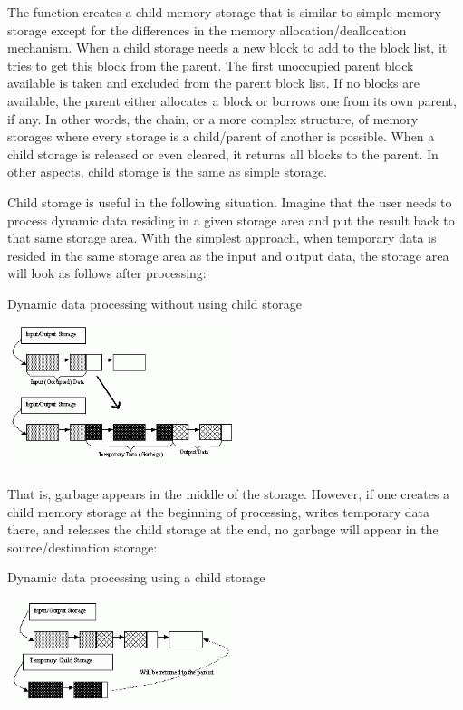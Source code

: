 
\begin{description}
\end{description}

The function creates a child memory
storage that is similar to simple memory storage except for the
differences in the memory allocation/deallocation mechanism. When a
child storage needs a new block to add to the block list, it tries
to get this block from the parent. The first unoccupied parent block
available is taken and excluded from the parent block list. If no blocks
are available, the parent either allocates a block or borrows one from
its own parent, if any. In other words, the chain, or a more complex
structure, of memory storages where every storage is a child/parent of
another is possible. When a child storage is released or even cleared,
it returns all blocks to the parent. In other aspects, child storage
is the same as simple storage.

Child storage is useful in the following situation. Imagine
that the user needs to process dynamic data residing in a given storage area and
put the result back to that same storage area. With the simplest approach,
when temporary data is resided in the same storage area as the input and
output data, the storage area will look as follows after processing:

Dynamic data processing without using child storage

\includegraphics[width=0.5\textwidth]{pics/memstorage1.png}

That is, garbage appears in the middle of the storage. However, if
one creates a child memory storage at the beginning of processing,
writes temporary data there, and releases the child storage at the end,
no garbage will appear in the source/destination storage:

Dynamic data processing using a child storage

\includegraphics[width=0.5\textwidth]{pics/memstorage2.png}

